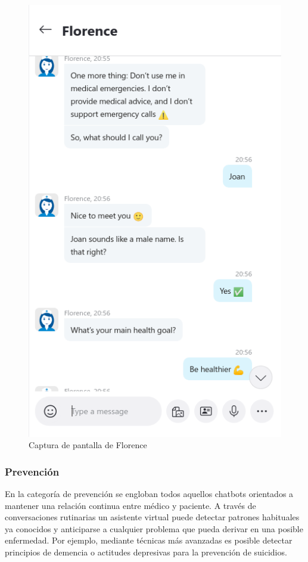 \begin{figure}[htbp]
\centering
\includegraphics[scale=0.5]{../images/florence.png} 
\caption{Captura de pantalla de Florence}
\label{fig:x captura florence}
\end{figure}

\subsubsection{Prevención}
En la categoría de prevención se engloban todos aquellos chatbots orientados a mantener una relación continua entre médico y paciente. A través de conversaciones rutinarias un asistente virtual puede detectar patrones habituales ya conocidos y anticiparse a cualquier problema que pueda derivar en una posible enfermedad. Por ejemplo, mediante técnicas más avanzadas es posible detectar principios de demencia \cite{detectDementia} o actitudes depresivas para la prevención de suicidios.\\

